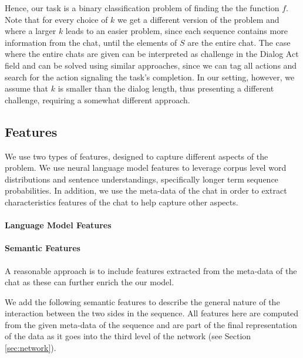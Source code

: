 Hence, our task is a binary classification 
problem of finding the the function $f$.  
Note that for every choice of $k$ we get a different 
version of the problem and where a larger $k$ leads 
to an easier problem, since each sequence contains 
more information from the chat, until the elements of $S$ 
are the entire chat. The case where the entire chats are 
given can be interpreted as challenge in the Dialog Act \cite{cs-CL-0006023,DBLP:conf/icassp/JiB05,DBLP:conf/coling/WermterL96}
field and can be solved using similar approaches, since we 
can tag all actions and search for the action signaling the task's completion. 
In our setting, however, we assume that $k$ is smaller than the dialog 
length, thus presenting a different challenge, requiring a somewhat different approach. 

\subsection{Features}
We use two types of features, designed to capture
different aspects of the problem. We use neural 
language model features to leverage corpus
level word distributions and sentence understandings, 
specifically longer term
sequence probabilities. In addition, we use the meta-data of the chat in order to extract characteristics features of the chat 
to help capture other aspects.

\paragraph*{Language Model Features}

\paragraph*{Semantic Features}\label{sec:semantic}
A reasonable approach is to include features 
extracted from the meta-data of the chat as 
these can further enrich the our model. 

We add the following semantic features 
to describe the general nature 
of the interaction between the two sides 
in the sequence. All features here 
are computed from the given meta-data of the sequence and 
are part of the final representation of the data as it goes into the 
third level of the network (see Section \ref{sec:network}). 

